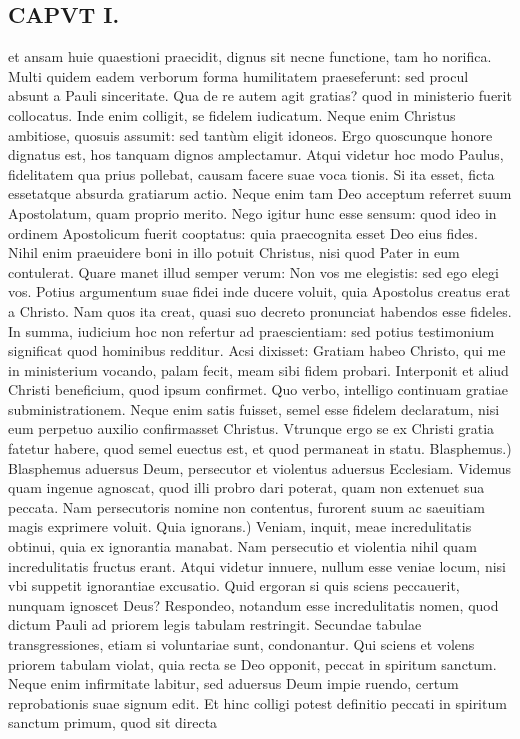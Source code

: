 \documentclass{article}
\begin{document}
\begin{pages}
\section*{CAPVT I. }
\marginpar{[ p.9 ]}\pstart et ansam huie quaestioni praecidit, dignus sit necne functione, tam ho norifica. Multi quidem eadem verborum forma humilitatem praeseferunt: sed procul absunt a Pauli sinceritate. Qua de re autem agit gratias? quod in ministerio fuerit collocatus. Inde enim colligit, se fidelem iudicatum. Neque enim Christus ambitiose, quosuis assumit: sed tantùm eligit idoneos. Ergo quoscunque honore dignatus est, hos tanquam dignos amplectamur. Atqui videtur hoc modo Paulus, fidelitatem qua prius pollebat, causam facere suae voca tionis. Si ita esset, ficta essetatque absurda gratiarum actio. Neque enim tam Deo acceptum referret suum Apostolatum, quam proprio merito. Nego igitur hunc esse sensum: quod ideo in ordinem Apostolicum fuerit cooptatus: quia praecognita esset Deo eius fides. Nihil enim praeuidere boni in illo potuit Christus, nisi quod Pater in eum contulerat. Quare manet illud semper verum: Non vos me elegistis: sed ego elegi vos. Potius argumentum suae fidei inde ducere voluit, quia Apostolus creatus erat a Christo. Nam quos ita creat, quasi suo decreto pronunciat habendos esse fideles. In summa, iudicium hoc non refertur ad praescientiam: sed potius testimonium significat quod hominibus redditur. Acsi dixisset: Gratiam habeo Christo, qui me in ministerium vocando, palam fecit, meam sibi fidem probari. Interponit et aliud Christi beneficium, quod ipsum confirmet. Quo verbo, intelligo continuam gratiae subministrationem. Neque enim satis fuisset, semel esse fidelem declaratum, nisi eum perpetuo auxilio confirmasset Christus. Vtrunque ergo se ex Christi gratia fatetur habere, quod semel euectus est, et quod permaneat in statu.  \pend\pstart Blasphemus.) Blasphemus aduersus Deum, persecutor et violentus aduersus Ecclesiam. Videmus quam ingenue agnoscat, quod illi probro dari poterat, quam non extenuet sua peccata. Nam persecutoris nomine non contentus, furorent suum ac saeuitiam magis exprimere voluit.  \pend\pstart Quia ignorans.) Veniam, inquit, meae incredulitatis obtinui, quia ex ignorantia manabat. Nam persecutio et violentia nihil quam incredulitatis fructus erant. Atqui videtur innuere, nullum esse veniae locum, nisi vbi suppetit ignorantiae excusatio. Quid ergoran si quis sciens peccauerit, nunquam ignoscet Deus? Respondeo, notandum esse incredulitatis nomen, quod dictum Pauli ad priorem legis tabulam restringit. Secundae tabulae transgressiones, etiam si voluntariae sunt, condonantur. Qui sciens et volens priorem tabulam violat, quia recta se Deo opponit, peccat in spiritum sanctum. Neque enim infirmitate labitur, sed aduersus Deum impie ruendo, certum reprobationis suae signum edit. Et hinc colligi potest definitio peccati in spiritum sanctum primum, quod sit directa  \pend

\end{pages}
\end{document}
